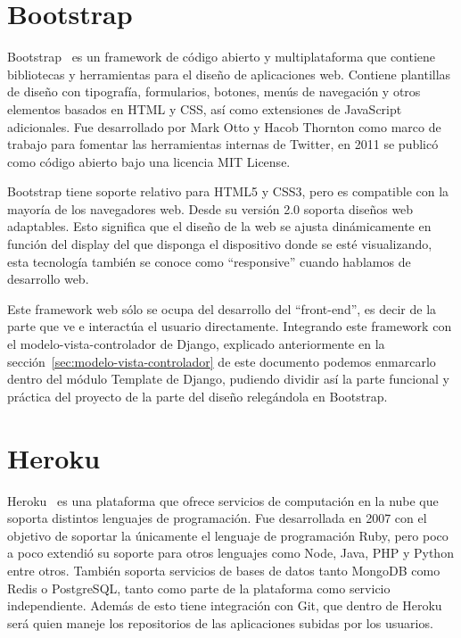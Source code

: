 \documentclass[a4paper, 12pt]{book}
\begin{document}
\section{Bootstrap}
\label{sec:bootstrap}
Bootstrap~\cite{bootstrap} es un framework de código abierto y multiplataforma que contiene bibliotecas y herramientas para el diseño de aplicaciones web. Contiene plantillas de diseño con tipografía, formularios, botones, menús de navegación y otros elementos basados en HTML y CSS, así como extensiones de JavaScript adicionales. Fue desarrollado por Mark Otto y Hacob Thornton como marco de trabajo para fomentar las herramientas internas de Twitter, en 2011 se publicó como código abierto bajo una licencia MIT License.

Bootstrap tiene soporte relativo para HTML5 y CSS3, pero es compatible con la mayoría de los navegadores web. Desde su versión 2.0 soporta diseños web adaptables. Esto significa que el diseño de la web se ajusta dinámicamente en función del display del que disponga el dispositivo donde se esté visualizando, esta tecnología también se conoce como ``responsive'' cuando hablamos de desarrollo web.

Este framework web sólo se ocupa del desarrollo del ``front-end'', es decir de la parte que ve e interactúa el usuario directamente. Integrando este framework con el modelo-vista-controlador de Django, explicado anteriormente en la sección~\ref{sec:modelo-vista-controlador} de este documento podemos enmarcarlo dentro del módulo Template de Django, pudiendo dividir así la parte funcional y práctica del proyecto de la parte del diseño relegándola en Bootstrap. 

\section{Heroku}
\label{sec:heroku}

Heroku~\cite{heroku} es una plataforma que ofrece servicios de computación en la nube que soporta distintos lenguajes de programación. Fue desarrollada en 2007 con el objetivo de soportar la únicamente el lenguaje de programación Ruby, pero poco a poco extendió su soporte para otros lenguajes como Node, Java, PHP y Python entre otros. También soporta servicios de bases de datos tanto MongoDB como Redis o PostgreSQL, tanto como parte de la plataforma como servicio independiente. Además de esto tiene integración con Git, que dentro de Heroku será quien maneje los repositorios de las aplicaciones subidas por los usuarios. 
\end{document}
